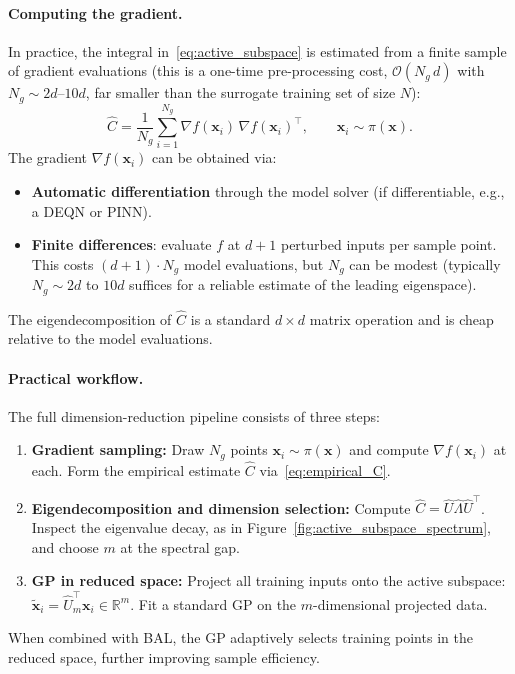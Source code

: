 \documentclass[11pt,a4paper]{report}
\newcommand{\x}{\bm{x}}
\newcommand{\R}{\mathbb{R}}
\begin{document}
\paragraph{Computing the gradient.}
In practice, the integral in~\eqref{eq:active_subspace} is estimated from a finite sample of gradient evaluations \citep[Ch.~1.5]{constantine2015active} (this is a one-time pre-processing cost, $\mathcal{O}(N_g\, d)$ with $N_g \sim 2d$--$10d$, far smaller than the surrogate training set of size $N$):
\begin{equation}
\hat{C} = \frac{1}{N_g}\sum_{i=1}^{N_g} \nabla f(\x_i)\,\nabla f(\x_i)^\top, \qquad \x_i \sim \pi(\x).
\label{eq:empirical_C}
\end{equation}
The gradient $\nabla f(\x_i)$ can be obtained via:
\begin{itemize}[itemsep=2pt]
\item \textbf{Automatic differentiation} through the model solver (if differentiable, e.g., a DEQN or PINN).
\item \textbf{Finite differences}: evaluate $f$ at $d+1$ perturbed inputs per sample point.  This costs $(d+1)\cdot N_g$ model evaluations, but $N_g$ can be modest (typically $N_g \sim 2d$ to $10d$ suffices for a reliable estimate of the leading eigenspace).
\end{itemize}
The eigendecomposition of $\hat{C}$ is a standard $d \times d$ matrix operation and is cheap relative to the model evaluations.

\paragraph{Practical workflow.}  The full dimension-reduction pipeline consists of three steps:
\begin{enumerate}[itemsep=2pt]
\item \textbf{Gradient sampling:} Draw $N_g$ points $\x_i \sim \pi(\x)$ and compute $\nabla f(\x_i)$ at each.  Form the empirical estimate $\hat{C}$ via~\eqref{eq:empirical_C}.
\item \textbf{Eigendecomposition and dimension selection:} Compute $\hat{C} = \hat{U}\hat{\Lambda}\hat{U}^\top$.  Inspect the eigenvalue decay, as in Figure~\ref{fig:active_subspace_spectrum}, and choose $m$ at the spectral gap.
\item \textbf{GP in reduced space:} Project all training inputs onto the active subspace: $\tilde{\x}_i = \hat{U}_m^\top \x_i \in \R^m$.  Fit a standard GP on the $m$-dimensional projected data.
\end{enumerate}
When combined with BAL, the GP adaptively selects training points in the reduced space, further improving sample efficiency.
\end{document}
